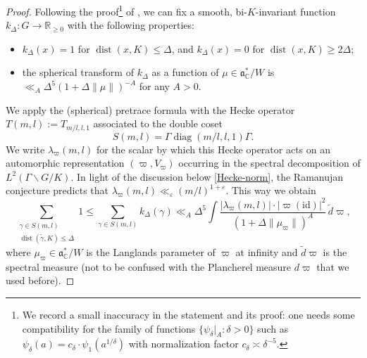 \documentclass[11pt,oneside]{amsart}
\numberwithin{equation}{section}
\theoremstyle{remark}
\theoremstyle{plain}
\DeclareMathOperator{\diag}{diag}
\DeclareMathOperator{\dist}{dist}
\newcommand\id{\mathrm{id}}
\newcommand\RR{\mathbb{R}}
\newcommand\CC{\mathbb{C}}
\newcommand\mfa{\mathfrak{a}}
\newcommand\bs{\backslash}
\newcommand\eps{\varepsilon}
\renewcommand\leq{\leqslant}
\renewcommand\geq{\geqslant}
\begin{document}
\begin{proof} Following the proof\footnote{We record a small inaccuracy in the statement and its proof: one needs some compatibility for the family of functions $\{\psi_\delta|_A:\delta>0\}$ such as $\psi_\delta(a)=c_\delta\cdot\psi_1(a^{1/\delta})$ with normalization factor $c_\delta\asymp\delta^{-5}$.} of \cite[Lem.~2]{Blomer-Lutsko}, we can fix a smooth, bi-$K$-invariant function $k_{\Delta}:G\to\RR_{\geq 0}$ with the following properties:
\begin{itemize}
\item $k_{\Delta}(x) = 1$ for $\dist(x, K) \leq \Delta$, and $k_{\Delta}(x) = 0$ for $\dist(x, K) \geq 2\Delta$;
\item the spherical transform of $k_\Delta$ as a function of $\mu \in \mfa^{\ast}_{\CC}/W$ is $\ll _A\Delta^5 (1 + \Delta \| \mu \|)^{-A}$ for any $A > 0$.
\end{itemize}

We apply the (spherical) pretrace formula with the Hecke operator $T(m,l):=T_{m/l,l,1}$ associated to the double coset
\[S(m,l)=\Gamma\diag(m/l, l, 1)\Gamma.\]
We write $\lambda_\varpi(m,l)$ for the scalar by which this Hecke operator acts on an automorphic representation $(\varpi,V_\varpi)$ occurring in the spectral decomposition of $L^2(\Gamma\bs G\slash K)$. In light of the discussion below \eqref{Hecke-norm}, the Ramanujan conjecture predicts that $ \lambda_{\varpi}(m, l) \ll_\eps (m/l)^{1+\eps}$. This way we obtain
\begin{equation}\label{spec}
\sum_{\substack{\gamma \in S(m, l)\\ \dist(\tilde{\gamma}, K) \leq \Delta}} 1 \leq \sum_{\gamma \in S(m, l)} k_{\Delta}(\gamma) \ll_A \Delta^5 \int \frac{|\lambda_{\varpi}(m, l)|\cdot|\varpi(\id)|^2}{(1 + \Delta \| \mu_{\varpi} \|)^{A}} \,\tilde d\varpi,
\end{equation}
where $\mu_{\varpi}\in\mfa^{\ast}_{\CC}/W$ is the Langlands parameter of $\varpi$ at infinity and $\tilde d\varpi$ is the spectral measure (not to be confused with the Plancherel measure $d\varpi$ that we used before).


\end{proof}
\end{document}
